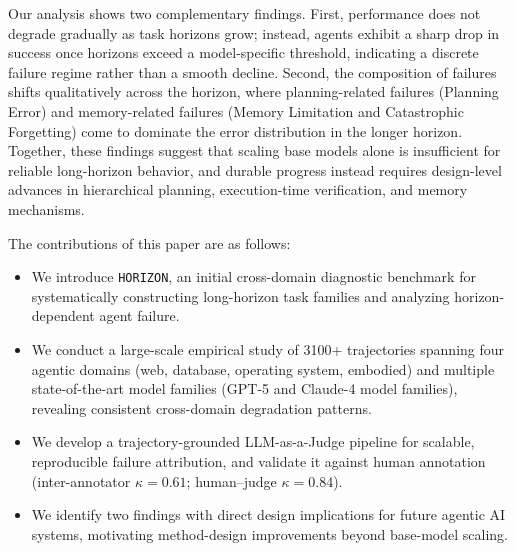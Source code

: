 \documentclass[11pt]{article}
\begin{document}
Our analysis shows two complementary findings. First, performance does not degrade gradually as task horizons grow; instead, agents exhibit a sharp drop in success once horizons exceed a model-specific threshold, indicating a discrete failure regime rather than a smooth decline. Second, the composition of failures shifts qualitatively across the horizon, where planning-related failures (Planning Error) and memory-related failures (Memory Limitation and Catastrophic Forgetting) come to dominate the error distribution in the longer horizon. Together, these findings suggest that scaling base models alone is insufficient for reliable long-horizon behavior, and durable progress instead requires design-level advances in hierarchical planning, execution-time verification, and memory mechanisms.




The contributions of this paper are as follows:
\begin{itemize}[noitemsep]
    \item We introduce \texttt{HORIZON}, an initial cross-domain diagnostic benchmark for systematically constructing long-horizon task families and analyzing horizon-dependent agent failure.
    \item We conduct a large-scale empirical study of 3100+ trajectories spanning four agentic domains (web, database, operating system, embodied) and multiple state-of-the-art model families (GPT-5 and Claude-4 model families), revealing consistent cross-domain degradation patterns.
    \item We develop a trajectory-grounded LLM-as-a-Judge pipeline for scalable, reproducible failure attribution, and validate it against human annotation (inter-annotator \(\kappa{=}0.61\); human–judge \(\kappa{=}0.84\)).
    \item We identify two findings with direct design implications for future agentic AI systems, motivating method-design improvements beyond base-model scaling.
\end{itemize}
\end{document}
